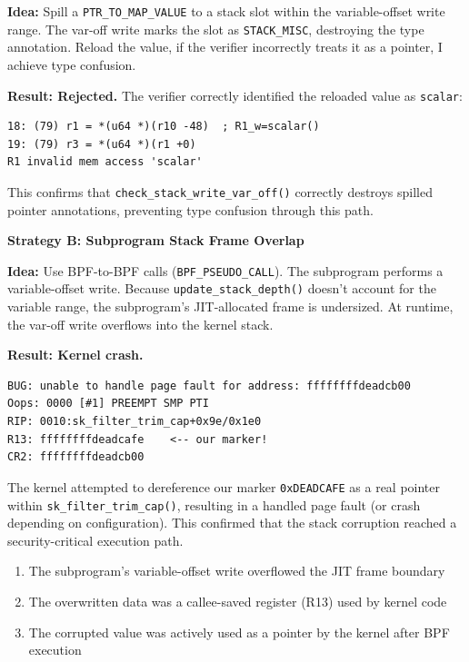 \textbf{Idea:} Spill a \texttt{PTR\_TO\_MAP\_VALUE} to a stack slot within the variable-offset write range. The var-off write marks the slot as \texttt{STACK\_MISC}, destroying the type annotation. Reload the value, if the verifier incorrectly treats it as a pointer, I achieve type confusion.

\textbf{Result: Rejected.} The verifier correctly identified the reloaded value as \texttt{scalar}:
\begin{lstlisting}[style=log]
18: (79) r1 = *(u64 *)(r10 -48)  ; R1_w=scalar()
19: (79) r3 = *(u64 *)(r1 +0)
R1 invalid mem access 'scalar'
\end{lstlisting}

This confirms that \texttt{check\_stack\_write\_var\_off()} correctly destroys spilled pointer annotations, preventing type confusion through this path.

\textbf{Strategy B: Subprogram Stack Frame Overlap}

\textbf{Idea:} Use BPF-to-BPF calls (\texttt{BPF\_PSEUDO\_CALL}). The subprogram performs a variable-offset write. Because \texttt{update\_stack\_depth()} doesn't account for the variable range, the subprogram's JIT-allocated frame is undersized. At runtime, the var-off write overflows into the kernel stack.

\textbf{Result: Kernel crash.}
\begin{lstlisting}[style=log,caption={Kernel oops from Strategy B}]
BUG: unable to handle page fault for address: ffffffffdeadcb00
Oops: 0000 [#1] PREEMPT SMP PTI
RIP: 0010:sk_filter_trim_cap+0x9e/0x1e0
R13: ffffffffdeadcafe    <-- our marker!
CR2: ffffffffdeadcb00
\end{lstlisting}

The kernel attempted to dereference our marker \texttt{0xDEADCAFE} as a real pointer within \texttt{sk\_\allowbreak filter\_\allowbreak trim\_\allowbreak cap()}, resulting in a handled page fault (or crash depending on configuration). This confirmed that the stack corruption reached a security-critical execution path.
\begin{enumerate}
    \item The subprogram's variable-offset write overflowed the JIT frame boundary
    \item The overwritten data was a callee-saved register (R13) used by kernel code
    \item The corrupted value was actively used as a pointer by the kernel after BPF execution
\end{enumerate}

